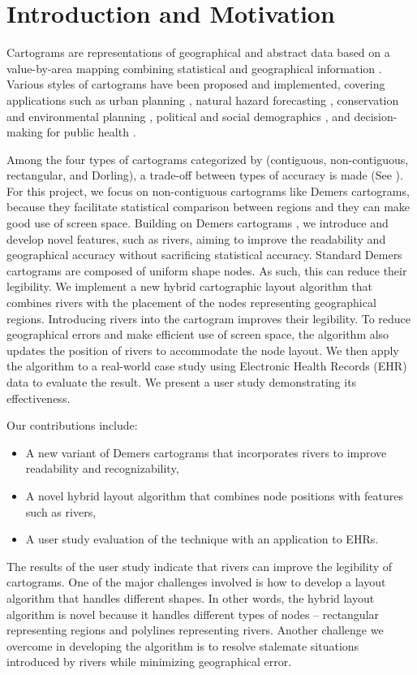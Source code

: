 \section{Introduction and Motivation}

Cartograms are representations of geographical and abstract data based on a value-by-area mapping combining statistical and geographical information \cite{dent2009Cartography}. Various styles of cartograms have been proposed and implemented, covering applications such as urban planning \cite{harris2018Mapping, arranz-lopez2021Enduser}, natural hazard forecasting \cite{pappenberger2019Cartograms, park2020Flood}, conservation and environmental planning \cite{galluzzi2018Mapping, rocchini2019Cartogramming}, political and social demographics \cite{breitzman2018Using, alieva2021How}, and decision-making for public health \cite{gao2020Visualising, sack2021Visualizing}.

Among the four types of cartograms categorized by  (contiguous, non-contiguous, rectangular, and Dorling), a trade-off between types of accuracy is made (See ). For this project, we focus on non-contiguous cartograms like Demers cartograms, because they facilitate statistical comparison between regions and they can make good use of screen space. Building on Demers cartograms \cite{ian2002Cartogram}, we introduce and develop novel features, such as rivers, aiming to improve the readability and geographical accuracy without sacrificing statistical accuracy. Standard Demers cartograms are composed of uniform shape nodes. As such, this can reduce their legibility. We implement a new hybrid cartographic layout algorithm that combines rivers with the placement of the nodes representing geographical regions. Introducing rivers into the cartogram improves their legibility. To reduce geographical errors and make efficient use of screen space, the algorithm also updates the position of rivers to accommodate the node layout. We then apply the algorithm to a real-world case study using Electronic Health Records (EHR) data to evaluate the result. We present a user study demonstrating its effectiveness.

Our contributions include:

\begin{itemize}
    \item A new variant of Demers cartograms that incorporates rivers to improve readability and recognizability,
    \item A novel hybrid layout algorithm that combines node positions with features such as rivers,
    \item A user study evaluation of the technique with an application to EHRs.
\end{itemize}

The results of the user study indicate that rivers can improve the legibility of cartograms. One of the major challenges involved is how to develop a layout algorithm that handles different shapes. In other words, the hybrid layout algorithm is novel because it handles different types of nodes -- rectangular representing regions and polylines representing rivers. Another challenge we overcome in developing the algorithm is to resolve stalemate situations introduced by rivers while minimizing geographical error.